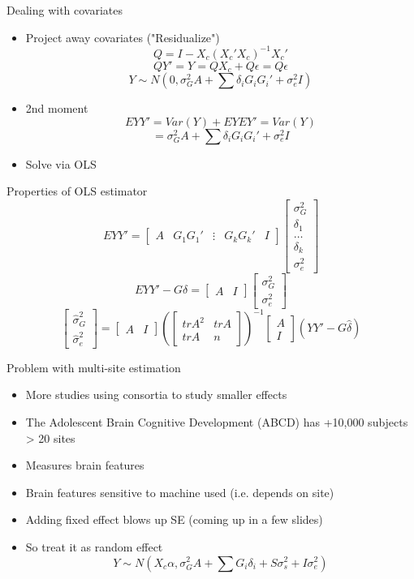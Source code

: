 \documentclass[
  ignorenonframetext,
]{beamer}
\begin{document}
\begin{frame}{Dealing with covariates}
\begin{itemize}
	\item Project away covariates ("Residualize")
	$$ Q = I - X_c(X_c'X_c)^{-1}X_c' $$
	$$ QY'= Y = QX_c + Q\epsilon = Q\epsilon $$
	$$ Y \sim N(0, \sigma_G^2 A + \sum \delta_i G_iG_i'+ \sigma_e^2 I) $$
	\item 2nd moment
	$$ EYY' = Var(Y) + EYEY' = Var(Y) $$
	$$ = \sigma_G^2 A + \sum \delta_i G_iG_i'+ \sigma_e^2 I$$
	\item Solve via OLS
\end{itemize}
\end{frame}

\begin{frame}{Properties of OLS estimator}
$$EYY' = \begin{bmatrix}
A & G_1G_1' & \vdots & G_kG_k' & I 
\end{bmatrix} \begin{bmatrix}
\sigma_G^2 \\ \delta_1 \\ \dots \\ \delta_k \\ \sigma_e^2
\end{bmatrix} $$
$$EYY' - G\delta = \begin{bmatrix}
A & I
\end{bmatrix}
\begin{bmatrix}
\sigma_G^2 \\ \sigma_e^2
\end{bmatrix} $$
$$\begin{bmatrix}
\hat\sigma_G^2 \\ \hat \sigma_e^2
\end{bmatrix} = \begin{bmatrix}
A & I 
\end{bmatrix}
(\begin{bmatrix}
trA^2 & trA \\
trA & n  
\end{bmatrix})^{-1}
\begin{bmatrix}
A \\ I 
\end{bmatrix}(YY' - G\hat \delta)$$
\end{frame}


\begin{frame}{Problem with multi-site estimation}
\begin{itemize}
	\item More studies using consortia to study smaller effects
	\item The Adolescent Brain Cognitive Development (ABCD) has +10,000 subjects > 20 sites
	\item Measures brain features
	\item Brain features sensitive to machine used (i.e. depends on site)
	\item Adding fixed effect blows up SE (coming up in a few slides)
	\item So treat it as random effect
	$$Y \sim N(X_c\alpha, \sigma_G^2A + \sum G_i\delta_i + S\sigma_s^2 + I\sigma_e^2) $$
\end{itemize}
\end{frame}
\end{document}
